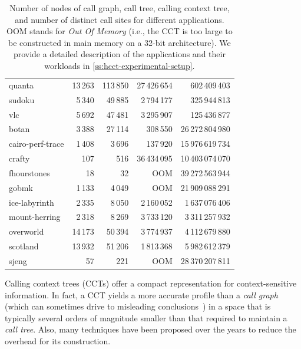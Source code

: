 \begin{table}[ht]
\begin{small}
\begin{tabular}{|l|r r r r|}
quanta & 13\,263 & 113\,850 & 27\,426\,654 & 602\,409\,403 \\
sudoku & 5\,340 & 49\,885 & 2\,794\,177 & 325\,944\,813 \\
vlc & 5\,692 & 47\,481 & 3\,295\,907 & 125\,436\,877 \\
\hline
\hline
botan & 3\,388 & 27\,114 & 308\,550 & 26\,272\,804\,980 \\
cairo-perf-trace & 1\,408 & 3\,696 & 137\,920 & 15\,976\,619\,734 \\
crafty & 107 & 516 & 36\,434\,095 & 10\,403\,074\,070 \\
fhourstones & 18 & 32 & OOM & 39\,272\,563\,944 \\
gobmk & 1\,133 & 4\,049 & OOM & 21\,909\,088\,291 \\
ice-labyrinth & 2\,335 & 8\,050 & 2\,160\,052 & 1\,637\,076\,406 \\
mount-herring & 2\,318 & 8\,269 & 3\,733\,120 & 3\,311\,257\,932 \\
overworld & 14\,173 & 50\,394 & 3\,774\,937 & 4\,112\,679\,880 \\
scotland & 13\,932 & 51\,206 & 1\,813\,368 & 5\,982\,612\,379 \\
sjeng & 57 & 221 & OOM & 28\,370\,207\,811 \\
\hline
\end{tabular}
\vspace{4mm}
\caption{\label{tab:hcct-CCTsize} Number of nodes of call graph, call tree, calling context tree, and number of distinct call sites for different applications. OOM stands for {\em Out Of Memory} (i.e., the CCT is too large to be constructed in main memory on a 32-bit architecture). We provide a detailed description of the applications and their workloads in \mysection\ref{ss:hcct-experimental-setup}.
}
\end{small}
\end{table}
\ifauthorea{\newline}{\vspace{-4mm}}

\noindent Calling context trees (CCTs) offer a compact representation for context-sensitive information. In fact, a CCT yields a more accurate profile than a {\em call graph} (which can sometimes drive to misleading conclusions~\cite{Ponder88, Spivey04}) in a space that is typically several orders of magnitude smaller than
that
required to maintain a {\em call tree}. Also, many techniques have been proposed over the years to reduce the overhead for its construction.

